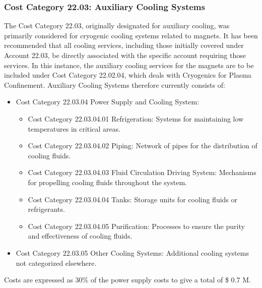 \subsubsection{Cost Category 22.03: Auxiliary Cooling Systems}

The Cost Category 22.03, originally designated for auxiliary cooling, was primarily considered for cryogenic cooling systems related to magnets. It has been recommended that all cooling services, including those initially covered under Account 22.03, be directly associated with the specific account requiring those services. In this instance, the auxiliary cooling services for the magnets are to be included under Cost Category 22.02.04, which deals with Cryogenics for Plasma Confinement. Auxiliary Cooling Systems therefore currently consists of:

\begin{itemize}
    \item Cost Category 22.03.04 Power Supply and Cooling System: 
    \begin{itemize}
        \item Cost Category 22.03.04.01 Refrigeration: Systems for maintaining low temperatures in critical areas.
        \item Cost Category 22.03.04.02 Piping: Network of pipes for the distribution of cooling fluids.
        \item Cost Category 22.03.04.03 Fluid Circulation Driving System: Mechanisms for propelling cooling fluids throughout the system.
        \item Cost Category 22.03.04.04 Tanks: Storage units for cooling fluids or refrigerants.
        \item Cost Category 22.03.04.05 Purification: Processes to ensure the purity and effectiveness of cooling fluids.
    \end{itemize}
    \item Cost Category 22.03.05 Other Cooling Systems: Additional cooling systems not categorized elsewhere.
\end{itemize}

Costs are expressed as 30\% of the power supply costs to give a total of \$ 0.7 M.
